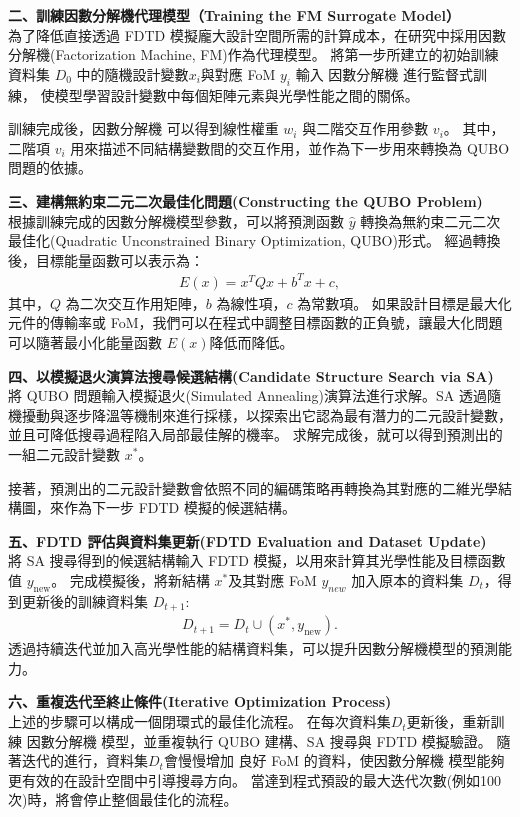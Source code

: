 \noindent \textbf{二、訓練因數分解機代理模型（Training the FM Surrogate Model）}\\
為了降低直接透過 FDTD 模擬龐大設計空間所需的計算成本，在研究中採用因數分解機(Factorization Machine, FM)作為代理模型。
將第一步所建立的初始訓練資料集 $D_0$ 中的隨機設計變數$x_i$與對應 FoM $y_i$ 輸入 因數分解機 進行監督式訓練，
使模型學習設計變數中每個矩陣元素與光學性能之間的關係。

訓練完成後，因數分解機 可以得到線性權重 $w_i$ 與二階交互作用參數 $v_i$。
其中，二階項 $v_i$ 用來描述不同結構變數間的交互作用，並作為下一步用來轉換為 QUBO 問題的依據。

\noindent \textbf{三、建構無約束二元二次最佳化問題(Constructing the QUBO Problem)}\\
根據訓練完成的因數分解機模型參數，可以將預測函數 $\hat{y}$ 轉換為無約束二元二次最佳化(Quadratic Unconstrained Binary Optimization, QUBO)形式。
經過轉換後，目標能量函數可以表示為：
\begin{align}
E(x)=x^{T}Qx+b^{T}x+c,
\end{align}
其中，$Q$ 為二次交互作用矩陣，$b$ 為線性項，$c$ 為常數項。
如果設計目標是最大化元件的傳輸率或 FoM，我們可以在程式中調整目標函數的正負號，讓最大化問題可以隨著最小化能量函數 $E(x)$降低而降低。

\noindent \textbf{四、以模擬退火演算法搜尋候選結構(Candidate Structure Search via SA)}\\
將 QUBO 問題輸入模擬退火(Simulated Annealing)演算法進行求解。SA 透過隨機擾動與逐步降溫等機制來進行採樣，以探索出它認為最有潛力的二元設計變數，
並且可降低搜尋過程陷入局部最佳解的機率。
求解完成後，就可以得到預測出的一組二元設計變數 $x^{*}$。

接著，預測出的二元設計變數會依照不同的編碼策略再轉換為其對應的二維光學結構圖，來作為下一步 FDTD 模擬的候選結構。

\noindent \textbf{五、FDTD 評估與資料集更新(FDTD Evaluation and Dataset Update)}\\
將 SA 搜尋得到的候選結構輸入 FDTD 模擬，以用來計算其光學性能及目標函數值 $y_{\mathrm{new}}$。
完成模擬後，將新結構 $x^*$及其對應 FoM $y_{new}$ 加入原本的資料集 $D_t$，得到更新後的訓練資料集 $D_{t+1}$:
\begin{align}
D_{t+1}=D_t\cup{(x^{*},y_{\mathrm{new}})}.
\end{align}
透過持續迭代並加入高光學性能的結構資料集，可以提升因數分解機模型的預測能力。

\noindent \textbf{六、重複迭代至終止條件(Iterative Optimization Process)}\\
上述的步驟可以構成一個閉環式的最佳化流程。
在每次資料集$D_t$更新後，重新訓練 因數分解機 模型，並重複執行 QUBO 建構、SA 搜尋與 FDTD 模擬驗證。
隨著迭代的進行，資料集$D_t$會慢慢增加 良好 FoM 的資料，使因數分解機 模型能夠更有效的在設計空間中引導搜尋方向。
當達到程式預設的最大迭代次數(例如100次)時，將會停止整個最佳化的流程。

